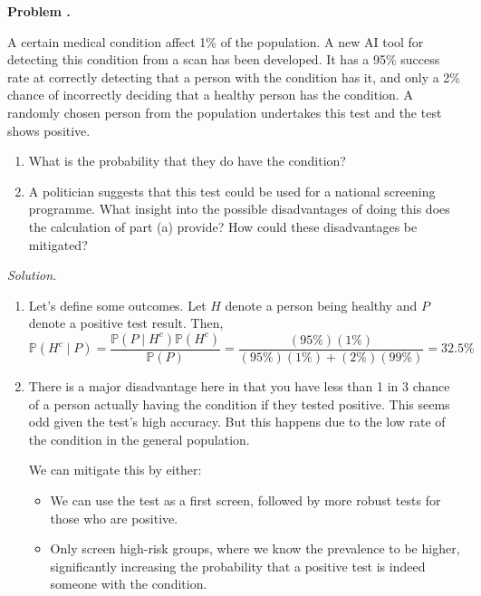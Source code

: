 \documentclass[11pt]{article}
\newcounter{problem}
\newenvironment{problem}[1][]{%
  \refstepcounter{problem}%
  \bigskip\noindent\textbf{Problem \theproblem. #1}\par\smallskip\noindent
}{\bigskip}
\newenvironment{solution}{%
  \noindent\textit{Solution.}\quad
}{\par\bigskip}
\begin{document}
\begin{problem}
A certain medical condition affect 1\% of the population. A new AI tool for detecting 
this condition from a scan has been developed. It has a 95\% success rate at 
correctly detecting that a person with the condition has it, and only a 2\% chance 
of incorrectly deciding that a healthy person has the condition. A randomly chosen 
person from the population undertakes this test and the test shows positive.
\begin{enumerate}
      \item What is the probability that they do have the condition?
      \item A politician suggests that this test could be used for a national 
            screening programme. What insight into the possible disadvantages of 
            doing this does the calculation of part (a) provide? How could these 
            disadvantages be mitigated?
\end{enumerate}
\end{problem}

\begin{solution}
\begin{enumerate}
      \item Let's define some outcomes. Let $H$ denote a person being healthy and 
            $P$ denote a positive test result. Then,
            \[
            \mathbb{P}(H^{c} \mid P) = \frac{\mathbb{P}(P \mid H^{c})\mathbb{P}(H^{c})}
                  {\mathbb{P}(P)} = \frac{\left(95\%\right)\left(1\%\right)}
                  {\left(95\%\right)\left(1\%\right) + \left(2\%\right)\left(99\%\right)}
                  = 32.5\%
            \]
      \item There is a major disadvantage here in that you have less than 1 in 3 
            chance of a person actually having the condition if they tested 
            positive. This seems odd given the test's high accuracy. But this 
            happens due to the low rate of the condition in the general population. 
            
            We can mitigate this by either: 
            \begin{itemize}
                  \item We can use the test as a first screen, followed by more robust 
                        tests for those who are positive.
                  \item Only screen high-risk groups, where we know the prevalence to be 
                        higher, significantly increasing the probability that a positive 
                        test is indeed someone with the condition.
            \end{itemize}
\end{enumerate}
\end{solution}
\end{document}
